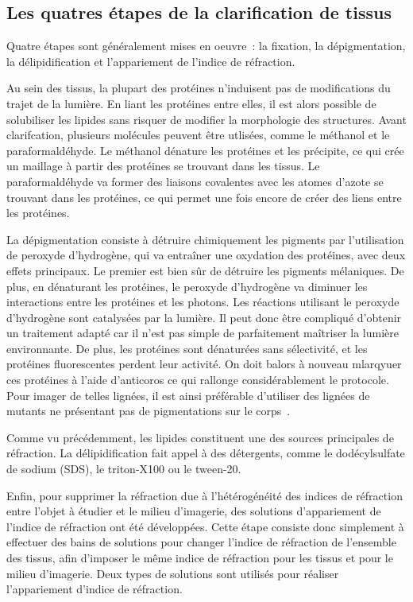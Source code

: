 \documentclass[\main/main.tex]{subfiles}
\begin{document}
\subsection{Les quatres étapes de la clarification de tissus\label{sec:clarification:etapes}}

Quatre étapes sont généralement mises en oeuvre~\cite{tainaka_2016,ueda_2020}: la fixation, la dépigmentation, la délipidification et l'appariement de l'indice de réfraction.
%

%
Au sein des tissus, la plupart des protéines n'induisent pas de modifications du trajet de la lumière. En liant les protéines entre elles, il est alors possible de solubiliser les lipides sans risquer de modifier la morphologie des structures. Avant clarifcation, plusieurs molécules peuvent être utlisées, comme le méthanol et le paraformaldéhyde. Le méthanol dénature les protéines et les précipite, ce qui crée un maillage à partir des protéines se trouvant dans les tissus. Le paraformaldéhyde va former des liaisons covalentes avec les atomes d'azote se trouvant dans les protéines, ce qui permet une fois encore de créer des liens entre les protéines.

%
La dépigmentation consiste à détruire chimiquement les pigments par l'utilisation de peroxyde d'hydrogène, qui va entraîner une oxydation des protéines, avec deux effets principaux. Le premier est bien sûr de détruire les pigments mélaniques. De plus, en dénaturant les protéines, le peroxyde d'hydrogène va diminuer les interactions entre les protéines et les photons.
%
Les réactions utilisant le peroxyde d'hydrogène sont catalysées par la lumière. Il peut donc être compliqué d'obtenir un traitement adapté car il n'est pas simple de parfaitement maîtriser la lumière environnante. De plus, les protéines sont dénaturées sans sélectivité, et les protéines fluorescentes perdent leur activité. On doit balors à nouveau mlarqyuer ces protéines à l'aide d'anticoros ce qui rallonge considérablement le protocole.
%
Pour imager de telles lignées, il est ainsi préférable d'utiliser des lignées de  mutants ne présentant pas de pigmentations sur le corps~\cite{white_2008,antinucci_2016}.

Comme vu précédemment, les lipides constituent une des sources principales de réfraction. %
%
La délipidification fait appel à des détergents, comme le dodécylsulfate de sodium (SDS), le triton-X100 ou le tween-20.

%
Enfin, pour supprimer la réfraction due à l'hétérogénéité des indices de réfraction entre l'objet à étudier et le milieu d'imagerie, des solutions d'appariement de l'indice de réfraction ont été développées.
%
Cette étape consiste donc simplement à effectuer des bains de solutions pour changer l'indice de réfraction de l'ensemble des tissus, afin d'imposer le même indice de réfraction pour les tissus et pour le milieu d'imagerie.
%
Deux types de solutions sont utilisés pour réaliser l'appariement d'indice de réfraction.
\end{document}
